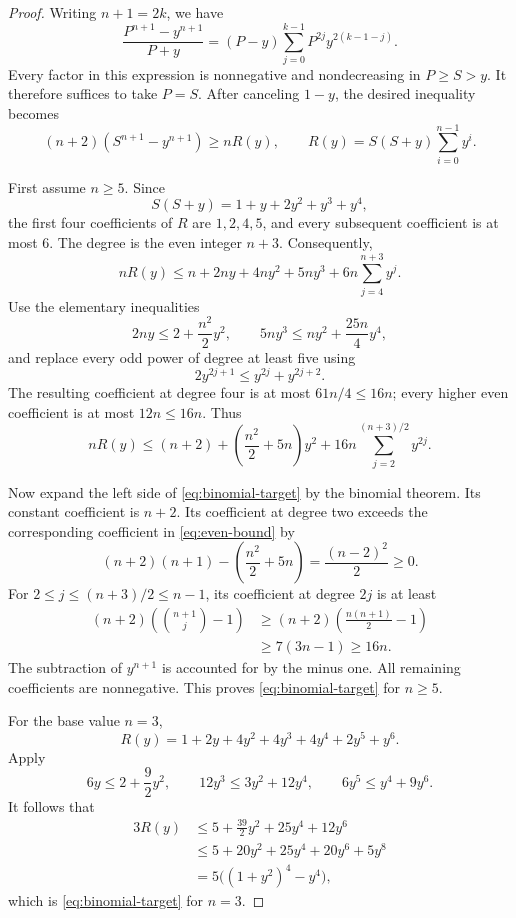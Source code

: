 \documentclass[11pt]{article}
\theoremstyle{remark}
\begin{document}
\begin{proof}
Writing $n+1=2k$, we have
\[
 \frac{P^{n+1}-y^{n+1}}{P+y}
 =(P-y)\sum_{j=0}^{k-1}P^{2j}y^{2(k-1-j)}.
\]
Every factor in this expression is nonnegative and nondecreasing in $P\ge S>y$. It therefore suffices to take $P=S$. After canceling $1-y$, the desired inequality becomes
\begin{equation}\label{eq:binomial-target}
 (n+2)(S^{n+1}-y^{n+1})\ge nR(y),
 \qquad
 R(y)=S(S+y)\sum_{i=0}^{n-1}y^i.
\end{equation}

First assume $n\ge5$. Since
\[
 S(S+y)=1+y+2y^2+y^3+y^4,
\]
the first four coefficients of $R$ are $1,2,4,5$, and every subsequent coefficient is at most $6$. The degree is the even integer $n+3$. Consequently,
\[
 nR(y)\le n+2ny+4ny^2+5ny^3
                  +6n\sum_{j=4}^{n+3}y^j.
\]
Use the elementary inequalities
\[
 2ny\le2+\frac{n^2}{2}y^2,
 \qquad
 5ny^3\le ny^2+\frac{25n}{4}y^4,
\]
and replace every odd power of degree at least five using
\[
 2y^{2j+1}\le y^{2j}+y^{2j+2}.
\]
The resulting coefficient at degree four is at most $61n/4\le16n$; every higher even coefficient is at most $12n\le16n$. Thus
\begin{equation}\label{eq:even-bound}
 nR(y)\le(n+2)+\left(\frac{n^2}{2}+5n\right)y^2
          +16n\sum_{j=2}^{(n+3)/2}y^{2j}.
\end{equation}

Now expand the left side of \eqref{eq:binomial-target} by the binomial theorem. Its constant coefficient is $n+2$. Its coefficient at degree two exceeds the corresponding coefficient in \eqref{eq:even-bound} by
\[
 (n+2)(n+1)-\left(\frac{n^2}{2}+5n\right)
 =\frac{(n-2)^2}{2}\ge0.
\]
For $2\le j\le(n+3)/2\le n-1$, its coefficient at degree $2j$ is at least
\begin{align*}
 (n+2)\left(\binom{n+1}{j}-1\right)
 &\ge(n+2)\left(\frac{n(n+1)}2-1\right)\\
 &\ge7(3n-1)\ge16n.
\end{align*}
The subtraction of $y^{n+1}$ is accounted for by the minus one. All remaining coefficients are nonnegative. This proves \eqref{eq:binomial-target} for $n\ge5$.

For the base value $n=3$,
\[
 R(y)=1+2y+4y^2+4y^3+4y^4+2y^5+y^6.
\]
Apply
\[
 6y\le2+\frac92y^2,\qquad
 12y^3\le3y^2+12y^4,\qquad
 6y^5\le y^4+9y^6.
\]
It follows that
\begin{align*}
 3R(y)&\le5+\frac{39}{2}y^2+25y^4+12y^6\\
 &\le5+20y^2+25y^4+20y^6+5y^8\\
 &=5\bigl((1+y^2)^4-y^4\bigr),
\end{align*}
which is \eqref{eq:binomial-target} for $n=3$.
\end{proof}
\end{document}
